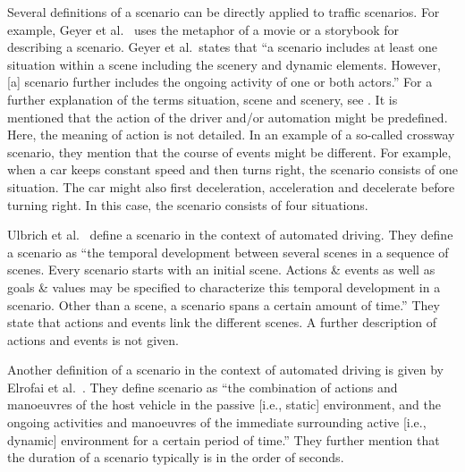 \documentclass[10pt,final,a4paper,oneside,onecolumn]{article}
\begin{document}
Several definitions of a scenario can be directly applied to traffic scenarios. For example, Geyer et al.\ \cite{geyer2014} uses the metaphor of a movie or a storybook for describing a scenario. Geyer et al.\ states that ``a scenario includes at least one situation within a scene including the scenery and dynamic elements. However, [a] scenario further includes the ongoing activity of one or both actors.'' For a further explanation of the terms situation, scene and scenery, see \cite{geyer2014}. It is mentioned that the action of the driver and/or automation might be predefined. Here, the meaning of action is not detailed. In an example of a so-called crossway scenario, they mention that the course of events might be different. For example, when a car keeps constant speed and then turns right, the scenario consists of one situation. The car might also first deceleration, acceleration and decelerate before turning right. In this case, the scenario consists of four situations.

Ulbrich et al.\ \cite{ulbrich2015} define a scenario in the context of automated driving. They define a scenario as ``the temporal development between several scenes in a sequence of scenes. Every scenario starts with an initial scene. Actions \& events as well as goals \& values may be specified to characterize this temporal development in a scenario. Other than a scene, a scenario spans a certain amount of time.'' They state that actions and events link the different scenes. A further description of actions and events is not given.

Another definition of a scenario in the context of automated driving is given by Elrofai et al.\ \cite{elrofai2016scenario}. They define scenario as ``the combination of actions and manoeuvres of the host vehicle in the passive [i.e., static] environment, and the ongoing activities and manoeuvres of the immediate surrounding active [i.e., dynamic] environment for a certain period of time.'' They further mention that the duration of a scenario typically is in the order of seconds.
\end{document}
